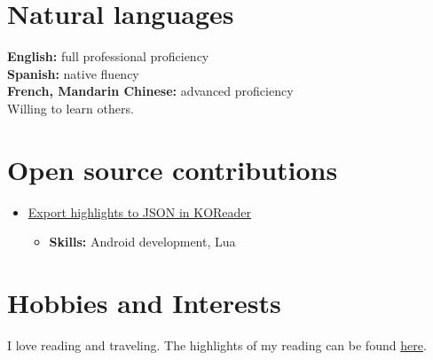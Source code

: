 \documentclass[11pt]{article}
\begin{document}
\section*{Natural languages}
\label{sec:org6522a36}
\textbf{English:} full professional proficiency\\[0pt]
\textbf{Spanish:} native fluency\\[0pt]
\textbf{French, Mandarin Chinese:} advanced proficiency\\[0pt]
Willing to learn others.\\[0pt]
\section*{Open source contributions}
\label{sec:orgb6ddf3a}
\begin{itemize}
\item \href{https://github.com/koreader/koreader/pull/6067}{Export highlights to JSON in KOReader}\\[0pt]
\begin{itemize}
\item \textbf{Skills:} Android development, Lua\\[0pt]
\end{itemize}
\end{itemize}
\section*{Hobbies and Interests}
\label{sec:org6cf0da4}
I love reading and traveling. The highlights of my reading can be found \href{https://github.com/RCoeurjoly/my\_clippings/blob/master/clippings.org}{here}.\\[0pt]
\end{document}
